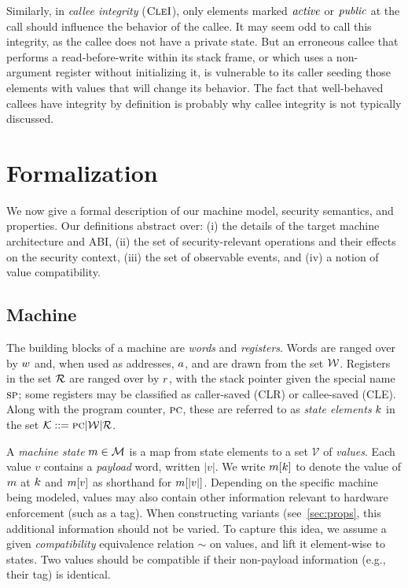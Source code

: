 \documentclass[10pt,conference]{ieeetran}%
\theoremstyle{definition}
\begin{document}
Similarly, in \emph{callee integrity} (\(\textnormal{\sc CleI}\)), only elements marked \(\mathit{active}\)
or \(\mathit{public}\) at the call should influence the behavior of the callee. It may seem
odd to call this integrity, as the callee does not have a private state. But
an erroneous callee that performs a read-before-write within its stack
frame, or which uses a non-argument register without initializing it, is vulnerable
to its caller seeding those elements with values that will change its behavior.
The fact that well-behaved callees have integrity by definition is probably why
callee integrity is not typically discussed.

\section{Formalization}
\label{sec:formal}

We now give a formal description of our machine model, security semantics,
and properties. Our definitions abstract over: (i) the details of  the target machine
architecture and ABI, (ii) the set of security-relevant operations and their effects on
the security context, (iii) the set of observable events, and (iv) a notion of value compatibility.

\subsection{Machine}
The building blocks of a machine are {\em words} and {\em registers}.
Words are ranged over by \(w\) and, when used as addresses, \(a\),
and are drawn from the set \({\mathcal W}\).
Registers in the set \({\mathcal R}\) are ranged over by \(r\), with the stack pointer
given the special name \(\textsc{sp}\);
some registers may be classified as caller-saved (CLR) or callee-saved (CLE).
Along with the program counter, \(\textsc{pc}\), these are referred to as
{\em state elements} \(k\) in the set \({\mathcal K} ::= \textsc{pc} | {\mathcal W} | {\mathcal R}\).

A {\em machine state} \(m \in {\mathcal M}\) is a map from state elements to a set \(\mathcal{V}\) of
\emph{values}.
Each value \(v\) contains a \emph{payload} word, written \(|v|\).
We write \(m[k]\) to denote the value of \(m\) at
\(k\)  and \(m[v]\) as shorthand for \(m[|v|]\).
Depending on the specific machine being modeled, values may also contain other
information relevant to hardware enforcement (such as a tag).
When constructing variants (see~\cref{sec:props}, this additional information should
not be varied. To capture this idea, we assume a given \emph{compatibility} equivalence relation \(\sim\) on values,
and lift it element-wise to states.  Two values should be compatible if their
non-payload information (e.g., their tag) is identical.
\end{document}
